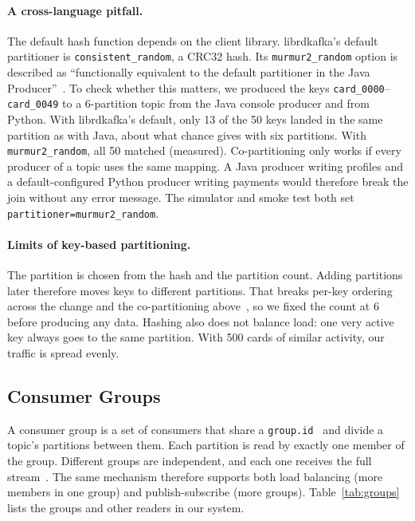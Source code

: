 \paragraph{A cross-language pitfall.}
The default hash function depends on the client library. librdkafka's default partitioner is \texttt{consistent\_random}, a CRC32 hash. Its \texttt{murmur2\_random} option is described as ``functionally equivalent to the default partitioner in the Java Producer''~\cite{librdkafka-config}. To check whether this matters, we produced the keys \texttt{card\_0000}--\texttt{card\_0049} to a 6-partition topic from the Java console producer and from Python. With librdkafka's default, only 13 of the 50 keys landed in the same partition as with Java, about what chance gives with six partitions. With \texttt{murmur2\_random}, all 50 matched (measured). Co-partitioning only works if every producer of a topic uses the same mapping. A Java producer writing profiles and a default-configured Python producer writing payments would therefore break the join without any error message. The simulator and smoke test both set \texttt{partitioner=murmur2\_random}.

\paragraph{Limits of key-based partitioning.}
The partition is chosen from the hash and the partition count. Adding partitions later therefore moves keys to different partitions. That breaks per-key ordering across the change and the co-partitioning above~\cite{shapira2021}, so we fixed the count at 6 before producing any data. Hashing also does not balance load: one very active key always goes to the same partition. With 500 cards of similar activity, our traffic is spread evenly.

\subsection{Consumer Groups}
\label{sec:groups}

A consumer group is a set of consumers that share a \texttt{group.id}~\cite{kafka-consumer-configs} and divide a topic's partitions between them. Each partition is read by exactly one member of the group. Different groups are independent, and each one receives the full stream~\cite{shapira2021}. The same mechanism therefore supports both load balancing (more members in one group) and publish-subscribe (more groups). Table~\ref{tab:groups} lists the groups and other readers in our system.

